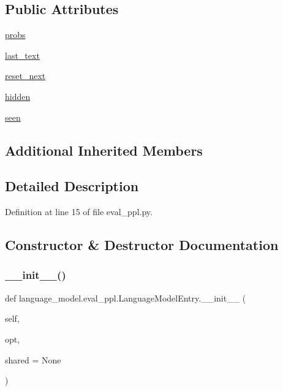 \subsection*{Public Attributes}
\begin{DoxyCompactItemize}
\item 
\hyperlink{classlanguage__model_1_1eval__ppl_1_1LanguageModelEntry_a56bd1620561edf44373182bf5324d1bd}{probs}
\item 
\hyperlink{classlanguage__model_1_1eval__ppl_1_1LanguageModelEntry_af1143417ff0e3910c4fabc386e17ff94}{last\+\_\+text}
\item 
\hyperlink{classlanguage__model_1_1eval__ppl_1_1LanguageModelEntry_a57e88deff0cee954bca24b4ff34c7729}{reset\+\_\+next}
\item 
\hyperlink{classlanguage__model_1_1eval__ppl_1_1LanguageModelEntry_a7c97d0414fa78165b9d85cc4399ac87d}{hidden}
\item 
\hyperlink{classlanguage__model_1_1eval__ppl_1_1LanguageModelEntry_a3beb0703ab3b39e2c38956978435fd17}{seen}
\end{DoxyCompactItemize}
\subsection*{Additional Inherited Members}


\subsection{Detailed Description}


Definition at line 15 of file eval\+\_\+ppl.\+py.



\subsection{Constructor \& Destructor Documentation}
\mbox{\label{classlanguage__model_1_1eval__ppl_1_1LanguageModelEntry_a295c7e2f6cb59aca07f985d82e4f34c5}} 
\subsubsection{\texorpdfstring{\+\_\+\+\_\+init\+\_\+\+\_\+()}{\_\_init\_\_()}}
{\footnotesize\ttfamily def language\+\_\+model.\+eval\+\_\+ppl.\+Language\+Model\+Entry.\+\_\+\+\_\+init\+\_\+\+\_\+ (\begin{DoxyParamCaption}\item[{}]{self,  }\item[{}]{opt,  }\item[{}]{shared = {\ttfamily None} }\end{DoxyParamCaption})}



